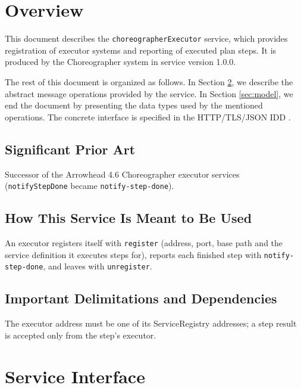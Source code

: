 \documentclass[a4paper]{arrowhead}
\begin{document}
\section{Overview}
\label{sec:overview}

This document describes the \texttt{choreographer\allowbreak{}Executor} service, which provides registration of executor systems and reporting of executed plan steps.
It is produced by the Choreographer system \cite{cho-sysd} in service version 1.0.0.

The rest of this document is organized as follows.
In Section \ref{sec:operations}, we describe the abstract message operations provided by the service.
In Section \ref{sec:model}, we end the document by presenting the data types used by the mentioned operations.
The concrete interface is specified in the HTTP/TLS/JSON IDD \cite{cho-choreographerExecutor-http-idd}.

\subsection{Significant Prior Art}

Successor of the Arrowhead 4.6 Choreographer executor services (\texttt{notifyStepDone} became \texttt{notify-\allowbreak{}step-\allowbreak{}done}).

\subsection{How This Service Is Meant to Be Used}

An executor registers itself with \texttt{register} (address, port, base path and the service definition it executes steps for), reports each finished step with \texttt{notify-\allowbreak{}step-\allowbreak{}done}, and leaves with \texttt{unregister}.

\subsection{Important Delimitations and Dependencies}
\label{sec:delimitations}

The executor address must be one of its ServiceRegistry addresses; a step result is accepted only from the step's executor.

\newpage

\section{Service Interface}
\label{sec:operations}
\end{document}
